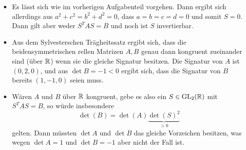\begin{itemize}
  \item
    Es lässt sich wie im vorherigen Aufgabenteil vorgehen.
    Dann ergibt sich allerdings aus $a^2 + c^2 = b^2 + d^2 = 0$, dass $a = b = c = d = 0$ und somit $S = 0$.
    Dann gilt aber weder $S^T A S = B$ und noch ist $S$ invertierbar.
  \item
    Aus dem Sylvesterschen Trägheitssatz ergibt sich, dass die beidensymmetrischen rellen Matrizen $A, B$ genau dann kongruent zueinander sind (über $\mathbb{R}$) wenn sie die gleiche Signatur besitzen.
    Die Signatur von $A$ ist $(0,2,0)$, und aus $\det B = -1 < 0$ ergibt sich, dass die Signatur von $B$ bereits $(1,-1,0)$ seien muss.
  \item
    Wären $A$ und $B$ über $\mathbb{R}$ kongruent, gebe es also ein $S \in \operatorname{GL}_{2}(\mathbb{R})$ mit $S^T A S = B$, so würde insbesondere
    \[
        \det(B)
      = \det(A) \underbrace{\det(S)^2}_{> 0}
    \]
    gelten.
    Dann müssten $\det A$ und $\det B$ das gleiche Vorzeichen besitzen, was wegen $\det A = 1$ und $\det B = -1$ aber nicht der Fall ist.
\end{itemize}




